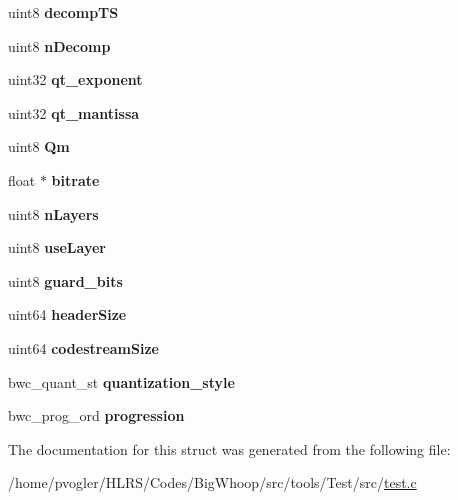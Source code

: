 \begin{DoxyCompactItemize}
\item 
\mbox{\label{structbwc__gl__ctrl_af2eef92d3ca2510ec5c851254f7ed72a}} 
uint8 {\bfseries decomp\+TS}
\item 
\mbox{\label{structbwc__gl__ctrl_adee9d135a3dcb8dcb1b141d9749c08ce}} 
uint8 {\bfseries n\+Decomp}
\item 
\mbox{\label{structbwc__gl__ctrl_a6178b6dd52ed8ffc8b3e97afc314ef13}} 
uint32 {\bfseries qt\+\_\+exponent}
\item 
\mbox{\label{structbwc__gl__ctrl_ab07b0dbe7374183857967568111871ea}} 
uint32 {\bfseries qt\+\_\+mantissa}
\item 
\mbox{\label{structbwc__gl__ctrl_a30818c519fbff2e2f50930c96bf5244b}} 
uint8 {\bfseries Qm}
\item 
\mbox{\label{structbwc__gl__ctrl_a7b70cbe591bb6acd66d427165c9e8750}} 
float $\ast$ {\bfseries bitrate}
\item 
\mbox{\label{structbwc__gl__ctrl_a5b245bd6742b72487de76ebedc406f86}} 
uint8 {\bfseries n\+Layers}
\item 
\mbox{\label{structbwc__gl__ctrl_a61299e0d3386a137a922e463aef1adde}} 
uint8 {\bfseries use\+Layer}
\item 
\mbox{\label{structbwc__gl__ctrl_a9b24ca4aa2be5a0f36a66e10ce6649b1}} 
uint8 {\bfseries guard\+\_\+bits}
\item 
\mbox{\label{structbwc__gl__ctrl_a20178945d9961e733194c1bdc1dce518}} 
uint64 {\bfseries header\+Size}
\item 
\mbox{\label{structbwc__gl__ctrl_a21ca8b0912c01ec9ea9ce88fa15f38f2}} 
uint64 {\bfseries codestream\+Size}
\item 
\mbox{\label{structbwc__gl__ctrl_ad76326703959e8cdbbd3a3f071df2de6}} 
bwc\+\_\+quant\+\_\+st {\bfseries quantization\+\_\+style}
\item 
\mbox{\label{structbwc__gl__ctrl_abf194495182e35077179fb56cc61c26e}} 
bwc\+\_\+prog\+\_\+ord {\bfseries progression}
\end{DoxyCompactItemize}


The documentation for this struct was generated from the following file\+:\begin{DoxyCompactItemize}
\item 
/home/pvogler/\+H\+L\+R\+S/\+Codes/\+Big\+Whoop/src/tools/\+Test/src/\mbox{\hyperlink{test_8c}{test.\+c}}\end{DoxyCompactItemize}
